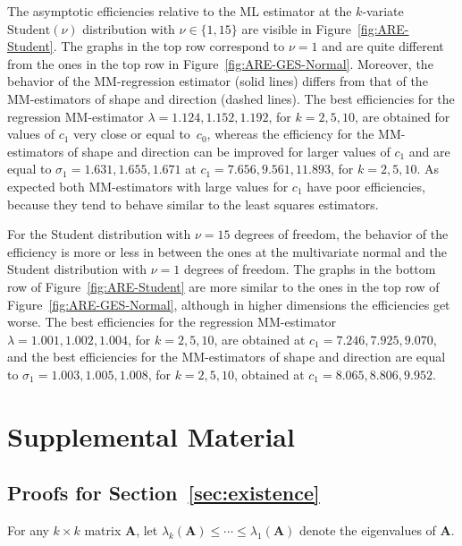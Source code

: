 \documentclass{article}
\numberwithin{equation}{section}
\theoremstyle{plain}
\newcommand{\bA}{\mathbf{A}}
\begin{document}
The asymptotic efficiencies relative to the ML estimator at the $k$-variate $\text{Student}(\nu)$ distribution with
$\nu\in\{1,15\}$ are visible in Figure~\ref{fig:ARE-Student}.
The graphs in the top row correspond to $\nu=1$ and are quite different from the ones in the top row in Figure~\ref{fig:ARE-GES-Normal}.
Moreover, the behavior of the MM-regression estimator (solid lines) differs from that of the MM-estimators of shape and direction (dashed lines).
The best efficiencies for the regression MM-estimator $\lambda=1.124, 1.152, 1.192$, for $k=2,5,10$, 
are obtained for values of $c_1$ very close or equal to~$c_0$,
whereas the efficiency for the MM-estimators of shape and direction can be improved for larger values of $c_1$
and are equal to $\sigma_1=1.631,1.655,1.671$ at $c_1=7.656,9.561,11.893$, for $k=2,5,10$.
As expected both MM-estimators with large values for $c_1$ have poor efficiencies, because they tend to behave similar
to the least squares estimators. 

For the Student distribution with $\nu=15$ degrees of freedom, the behavior of the efficiency is more or less 
in between the ones at the multivariate normal and the Student distribution with $\nu=1$ degrees of freedom.
The graphs in the bottom row of Figure~\ref{fig:ARE-Student} are more similar
to the ones in the top row of Figure~\ref{fig:ARE-GES-Normal}, although in higher dimensions the efficiencies get worse.
The best efficiencies for the regression MM-estimator $\lambda=1.001, 1.002, 1.004$, for $k=2,5,10$, 
are obtained at $c_1=7.246,7.925,9.070$,
and the best efficiencies for the MM-estimators of shape and direction 
are equal to $\sigma_1=1.003,1.005,1.008$, for $k=2,5,10$,
obtained at $c_1=8.065,8.806,9.952$.




\newpage

\setcounter{page}{1}

\section{Supplemental Material}

\subsection{Proofs for Section~\ref{sec:existence}}
For any $k\times k$ matrix $\bA$, let $\lambda_k(\bA)\leq\cdots\leq\lambda_1(\bA)$ denote the eigenvalues of $\bA$.
\end{document}
